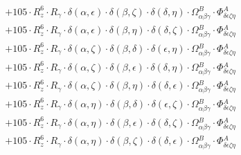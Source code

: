 \documentclass{article}
\begin{document}
\begin{equation}
\begin{array}{c}
 \\[0.2em] 		 + 105 \cdot R_{z}^{6} \cdot R_{\gamma{}} \cdot \delta{}\left(\alpha{}, \epsilon{}\right) \cdot \delta{}\left(\beta{}, \zeta{}\right) \cdot \delta{}\left(\delta{}, \eta{}\right) \cdot \Omega{}^{B}_{\alpha{}\beta{}\gamma{}} \cdot \Phi{}^{A}_{\delta{}\epsilon{}\zeta{}\eta{}} 
 \\[0.2em] 		 + 105 \cdot R_{z}^{6} \cdot R_{\gamma{}} \cdot \delta{}\left(\alpha{}, \epsilon{}\right) \cdot \delta{}\left(\beta{}, \eta{}\right) \cdot \delta{}\left(\delta{}, \zeta{}\right) \cdot \Omega{}^{B}_{\alpha{}\beta{}\gamma{}} \cdot \Phi{}^{A}_{\delta{}\epsilon{}\zeta{}\eta{}} 
 \\[0.2em] 		 + 105 \cdot R_{z}^{6} \cdot R_{\gamma{}} \cdot \delta{}\left(\alpha{}, \zeta{}\right) \cdot \delta{}\left(\beta{}, \delta{}\right) \cdot \delta{}\left(\epsilon{}, \eta{}\right) \cdot \Omega{}^{B}_{\alpha{}\beta{}\gamma{}} \cdot \Phi{}^{A}_{\delta{}\epsilon{}\zeta{}\eta{}} 
 \\[0.2em] 		 + 105 \cdot R_{z}^{6} \cdot R_{\gamma{}} \cdot \delta{}\left(\alpha{}, \zeta{}\right) \cdot \delta{}\left(\beta{}, \epsilon{}\right) \cdot \delta{}\left(\delta{}, \eta{}\right) \cdot \Omega{}^{B}_{\alpha{}\beta{}\gamma{}} \cdot \Phi{}^{A}_{\delta{}\epsilon{}\zeta{}\eta{}} 
 \\[0.2em] 		 + 105 \cdot R_{z}^{6} \cdot R_{\gamma{}} \cdot \delta{}\left(\alpha{}, \zeta{}\right) \cdot \delta{}\left(\beta{}, \eta{}\right) \cdot \delta{}\left(\delta{}, \epsilon{}\right) \cdot \Omega{}^{B}_{\alpha{}\beta{}\gamma{}} \cdot \Phi{}^{A}_{\delta{}\epsilon{}\zeta{}\eta{}} 
 \\[0.2em] 		 + 105 \cdot R_{z}^{6} \cdot R_{\gamma{}} \cdot \delta{}\left(\alpha{}, \eta{}\right) \cdot \delta{}\left(\beta{}, \delta{}\right) \cdot \delta{}\left(\epsilon{}, \zeta{}\right) \cdot \Omega{}^{B}_{\alpha{}\beta{}\gamma{}} \cdot \Phi{}^{A}_{\delta{}\epsilon{}\zeta{}\eta{}} 
 \\[0.2em] 		 + 105 \cdot R_{z}^{6} \cdot R_{\gamma{}} \cdot \delta{}\left(\alpha{}, \eta{}\right) \cdot \delta{}\left(\beta{}, \epsilon{}\right) \cdot \delta{}\left(\delta{}, \zeta{}\right) \cdot \Omega{}^{B}_{\alpha{}\beta{}\gamma{}} \cdot \Phi{}^{A}_{\delta{}\epsilon{}\zeta{}\eta{}} 
 \\[0.2em] 		 + 105 \cdot R_{z}^{6} \cdot R_{\gamma{}} \cdot \delta{}\left(\alpha{}, \eta{}\right) \cdot \delta{}\left(\beta{}, \zeta{}\right) \cdot \delta{}\left(\delta{}, \epsilon{}\right) \cdot \Omega{}^{B}_{\alpha{}\beta{}\gamma{}} \cdot \Phi{}^{A}_{\delta{}\epsilon{}\zeta{}\eta{}} 

\end{array}
\end{equation}
\end{document}

